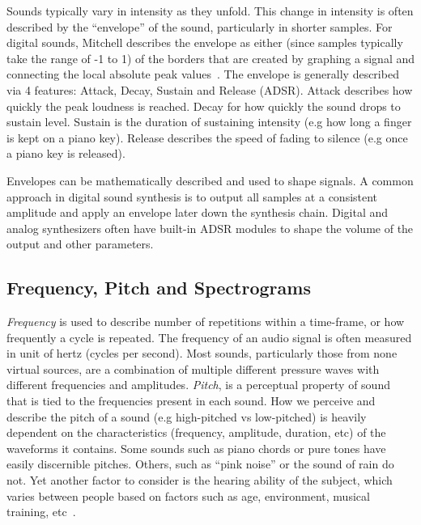 \documentclass[\main/thesis.tex]{subfiles}
\begin{document}
Sounds typically vary in intensity as they unfold. This change in intensity is often described by the \enquote{envelope} of the sound, particularly in shorter samples. For digital sounds, Mitchell describes the envelope as either (since samples typically take the range of -1 to 1) of the borders that are created by graphing a signal and connecting the local absolute peak values~\cite{mitchell2009basicsynthChap6}. The envelope is generally described via 4 features: Attack, Decay, Sustain and Release (ADSR). Attack describes how quickly the peak loudness is reached. Decay for how quickly the sound drops to sustain level. Sustain is the duration of sustaining intensity (e.g how long a finger is kept on a piano key). Release describes the speed of fading to silence (e.g once a piano key is released).

Envelopes can be mathematically described and used to shape signals. A common approach in digital sound synthesis is to output all samples at a consistent amplitude and apply an envelope later down the synthesis chain. Digital and analog synthesizers often have built-in ADSR modules to shape the volume of the output and other parameters.  

\subsection{Frequency, Pitch and Spectrograms}
\textit{Frequency} is used to describe number of repetitions within a time-frame, or how frequently a cycle is repeated. The frequency of an audio signal is often measured in unit of hertz (cycles per second). Most sounds, particularly those from none virtual sources, are a combination of multiple different pressure waves with different frequencies and amplitudes. \textit{Pitch}, is a perceptual property of sound that is tied to the frequencies present in each sound. How we perceive and describe the pitch of a sound (e.g high-pitched vs low-pitched) is heavily dependent on the characteristics (frequency, amplitude, duration, etc) of the waveforms it contains. Some sounds such as piano chords or pure tones have easily discernible pitches. Others, such as \enquote{pink noise} or the sound of rain do not. Yet another factor to consider is the hearing ability of the subject, which varies between people based on factors such as age, environment, musical training, etc~\cite{reiss2016meta,alain2007age,newman2012grm7}. 
\end{document}
